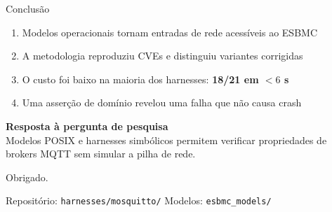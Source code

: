 \documentclass[10pt,aspectratio=169]{beamer}
\begin{document}
\begin{frame}{Conclus\~ao}
    \begin{enumerate}
        \item Modelos operacionais tornam entradas de rede acess\'iveis ao ESBMC
        \item A metodologia reproduziu CVEs e distinguiu variantes corrigidas
        \item O custo foi baixo na maioria dos harnesses: \textbf{18/21 em $<6$ s}
        \item Uma asser\c{c}\~ao de dom\'inio revelou uma falha que n\~ao causa crash
    \end{enumerate}

    \vspace{0.8em}
    \textbf{\alert{Resposta \`a pergunta de pesquisa}}\\[0.2em]
    Modelos POSIX e harnesses simb\'olicos permitem verificar propriedades
    de brokers MQTT sem simular a pilha de rede.
\end{frame}

\begin{frame}[standout]
    Obrigado.

    \vspace{0.8em}
    \small Reposit\'orio: \texttt{harnesses/mosquitto/} \quad
    Modelos: \texttt{esbmc\_models/}
\end{frame}
\end{document}
